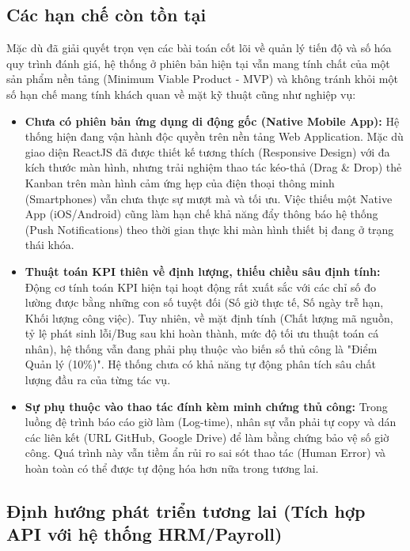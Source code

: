 \documentclass[a4paper,13.5pt]{extreport}
\begin{document}
\subsection{Các hạn chế còn tồn tại}

Mặc dù đã giải quyết trọn vẹn các bài toán cốt lõi về quản lý tiến độ và số hóa quy trình đánh giá, hệ thống ở phiên bản hiện tại vẫn mang tính chất của một sản phẩm nền tảng (Minimum Viable Product - MVP) và không tránh khỏi một số hạn chế mang tính khách quan về mặt kỹ thuật cũng như nghiệp vụ:

\begin{itemize}
    \item \textbf{Chưa có phiên bản ứng dụng di động gốc (Native Mobile App):} Hệ thống hiện đang vận hành độc quyền trên nền tảng Web Application. Mặc dù giao diện ReactJS đã được thiết kế tương thích (Responsive Design) với đa kích thước màn hình, nhưng trải nghiệm thao tác kéo-thả (Drag \& Drop) thẻ Kanban trên màn hình cảm ứng hẹp của điện thoại thông minh (Smartphones) vẫn chưa thực sự mượt mà và tối ưu. Việc thiếu một Native App (iOS/Android) cũng làm hạn chế khả năng đẩy thông báo hệ thống (Push Notifications) theo thời gian thực khi màn hình thiết bị đang ở trạng thái khóa.
    \item \textbf{Thuật toán KPI thiên về định lượng, thiếu chiều sâu định tính:} Động cơ tính toán KPI hiện tại hoạt động rất xuất sắc với các chỉ số đo lường được bằng những con số tuyệt đối (Số giờ thực tế, Số ngày trễ hạn, Khối lượng công việc). Tuy nhiên, về mặt định tính (Chất lượng mã nguồn, tỷ lệ phát sinh lỗi/Bug sau khi hoàn thành, mức độ tối ưu thuật toán cá nhân), hệ thống vẫn đang phải phụ thuộc vào biến số thủ công là "Điểm Quản lý (10\%)". Hệ thống chưa có khả năng tự động phân tích sâu chất lượng đầu ra của từng tác vụ.
    \item \textbf{Sự phụ thuộc vào thao tác đính kèm minh chứng thủ công:} Trong luồng đệ trình báo cáo giờ làm (Log-time), nhân sự vẫn phải tự copy và dán các liên kết (URL GitHub, Google Drive) để làm bằng chứng bảo vệ số giờ công. Quá trình này vẫn tiềm ẩn rủi ro sai sót thao tác (Human Error) và hoàn toàn có thể được tự động hóa hơn nữa trong tương lai.
\end{itemize}

\subsection{Định hướng phát triển tương lai (Tích hợp API với hệ thống HRM/Payroll)}
\end{document}
